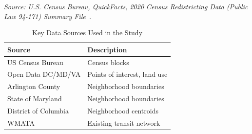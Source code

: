 \documentclass[sigconf,nonacm]{acmart}
\begin{document}


\begin{table}[h]
\caption{Counties and County-Equivalents in the Study Area}
\label{tab:counties}
\end{table}

\noindent\textit{Source: U.S. Census Bureau, QuickFacts, 2020 Census Redistricting Data (Public Law 94-171) Summary File~\cite{lit:census}.} 


\begin{table}[h]
\caption{Key Data Sources Used in the Study}
\label{tab:datasources}
\begin{tabular}{ll}
\toprule
Source & Description \\
\midrule
US Census Bureau & Census blocks \\
Open Data DC/MD/VA & Points of interest, land use \\
Arlington County & Neighborhood boundaries \\
State of Maryland & Neighborhood boundaries \\
District of Columbia & Neighborhood centroids \\
WMATA & Existing transit network \\
\bottomrule
\end{tabular}
\end{table}
\end{document}
